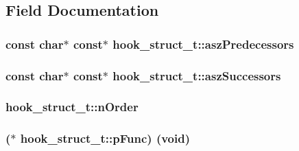 \subsection{Field Documentation}
\subsubsection[{\texorpdfstring{asz\+Predecessors}{aszPredecessors}}]{\setlength{\rightskip}{0pt plus 5cm}const char$\ast$ const$\ast$ hook\+\_\+struct\+\_\+t\+::asz\+Predecessors}\hypertarget{structhook__struct__t_adadd450889bc29810601c0859978e0ba}{}\label{structhook__struct__t_adadd450889bc29810601c0859978e0ba}
\subsubsection[{\texorpdfstring{asz\+Successors}{aszSuccessors}}]{\setlength{\rightskip}{0pt plus 5cm}const char$\ast$ const$\ast$ hook\+\_\+struct\+\_\+t\+::asz\+Successors}\hypertarget{structhook__struct__t_a104cb733e8b185b8513f43a4d76919c3}{}\label{structhook__struct__t_a104cb733e8b185b8513f43a4d76919c3}
\subsubsection[{\texorpdfstring{n\+Order}{nOrder}}]{ hook\+\_\+struct\+\_\+t\+::n\+Order}\hypertarget{structhook__struct__t_a2988ee834682354dcf837aa7de362e93}{}\label{structhook__struct__t_a2988ee834682354dcf837aa7de362e93}
\subsubsection[{\texorpdfstring{p\+Func}{pFunc}}]{($\ast$ hook\+\_\+struct\+\_\+t\+::p\+Func) ({\bf void})}\hypertarget{structhook__struct__t_a481c73af70470dcb807b123826da3583}{}\label{structhook__struct__t_a481c73af70470dcb807b123826da3583}
